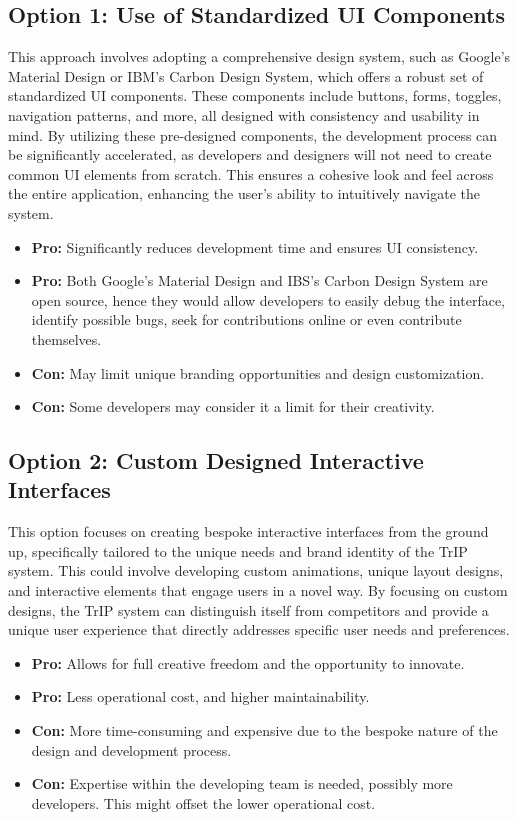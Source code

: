\subsection*{Option 1: Use of Standardized UI Components}
This approach involves adopting a comprehensive design system, such as Google's Material Design or IBM’s Carbon Design System, which offers a robust set of standardized UI components. These components include buttons, forms, toggles, navigation patterns, and more, all designed with consistency and usability in mind. By utilizing these pre-designed components, the development process can be significantly accelerated, as developers and designers will not need to create common UI elements from scratch. This ensures a cohesive look and feel across the entire application, enhancing the user's ability to intuitively navigate the system.
\begin{itemize}
    \item \textbf{Pro:} Significantly reduces development time and ensures UI consistency.
    \item \textbf{Pro:} Both Google's Material Design and IBS's Carbon Design System are open source, hence they would allow developers to easily debug the interface, identify possible bugs, seek for contributions online or even contribute themselves.
    \item \textbf{Con:} May limit unique branding opportunities and design customization. 
    \item \textbf{Con:} Some developers may consider it a limit for their creativity. 
\end{itemize}

\subsection*{Option 2: Custom Designed Interactive Interfaces}
This option focuses on creating bespoke interactive interfaces from the ground up, specifically tailored to the unique needs and brand identity of the TrIP system. This could involve developing custom animations, unique layout designs, and interactive elements that engage users in a novel way. By focusing on custom designs, the TrIP system can distinguish itself from competitors and provide a unique user experience that directly addresses specific user needs and preferences.
\begin{itemize}
    \item \textbf{Pro:} Allows for full creative freedom and the opportunity to innovate.
    \item \textbf{Pro:} Less operational cost, and higher maintainability.
    \item \textbf{Con:} More time-consuming and expensive due to the bespoke nature of the design and development process.
    \item \textbf{Con:} Expertise within the developing team is needed, possibly more developers. This might offset the lower operational cost.
\end{itemize}

